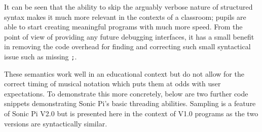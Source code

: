 \documentclass[11pt]{scrartcl}
\begin{document}
It can be seen that the ability to skip the arguably verbose nature of 
structured syntax makes it much more relevant in the contexts of a classroom; 
pupils are able to start creating meaningful programs with much more speed. From 
the point of view of providing any future debugging interfaces, it has a small 
benefit in removing the code overhead for finding and correcting such small 
syntactical issue such as missing \texttt{;}. 

These semantics work well in an educational context but do not allow for the 
correct timing of musical notation which puts them at odds with user 
expectations. To demonstrate this more concretely, below are two further code 
snippets demonstrating Sonic Pi's basic threading abilities. Sampling is a 
feature of Sonic Pi V2.0 but is presented here in the context of V1.0 
programs as the two versions are syntactically similar.
\end{document}
